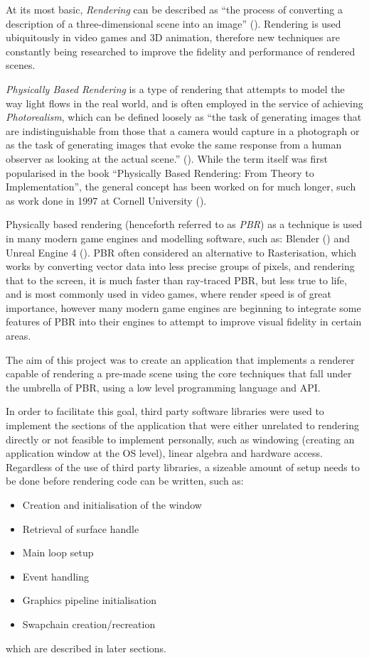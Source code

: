 \documentclass[../report.tex]{subfiles}
\begin{document}
At its most basic, \emph{Rendering} can be described as ``the process of converting a description of a three-dimensional
scene into an image'' (\cite{pbr-book}). Rendering is used ubiquitously in video games and 3D animation, therefore new techniques are constantly 
being researched to improve the fidelity and performance of rendered scenes.

\emph{Physically Based Rendering} is a type of rendering that attempts to model the way light flows in the real world, and is often employed in the service of 
achieving \emph{Photorealism}, which can be defined loosely as 
``the task of generating images that are indistinguishable from
those that a camera would capture in a photograph or as the task of generating images
that evoke the same response from a human observer as looking at the actual scene.'' (\cite{pbr-book}). 
While the term itself was first popularised in the book ``Physically Based Rendering: From Theory to Implementation'', the general concept has been worked on 
for much longer, such as work done in 1997 at Cornell University (\cite{greenberg}).

Physically based rendering (henceforth referred to as \emph{PBR}) as a technique is used in many modern game engines and modelling software, such as: Blender (\cite{blender-bsdf-docs}) and
Unreal Engine 4 (\cite{ue4-pbr-docs}). PBR often considered an alternative to Rasterisation, which works by converting vector data into less precise groups of pixels, and rendering that to the screen, it is much faster than ray-traced PBR, but less true to life, and is most commonly used in video games, where render speed is of great importance, however many modern game engines are beginning to integrate some features of PBR into their engines to attempt to improve visual fidelity in certain areas.

The aim of this project was to create an application that implements a renderer capable of rendering a pre-made scene using the core techniques that fall under 
the umbrella of PBR, using a low level programming language and API.

In order to facilitate this goal, third party software libraries
were used to implement the sections of the application that were either unrelated to rendering directly or not feasible to implement personally, such as windowing 
(creating an application window at the OS level), linear algebra and hardware access. Regardless of the use of third party libraries, a sizeable amount of setup needs
to be done before rendering code can be written, such as:
\begin{itemize}
    \item Creation and initialisation of the window
    \item Retrieval of surface handle
    \item Main loop setup
    \item Event handling
    \item Graphics pipeline initialisation
    \item Swapchain creation/recreation
\end{itemize}
which are described in later sections.
\end{document}

